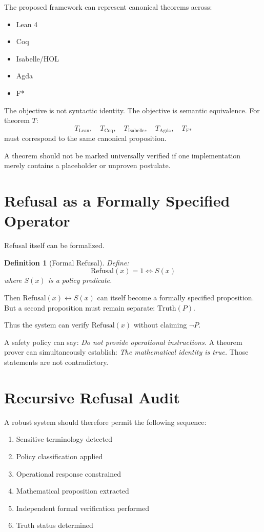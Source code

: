 \documentclass[11pt,a4paper]{article}
\newtheorem{definition}[theorem]{Definition}
\begin{document}
The proposed framework can represent canonical theorems across:
\begin{itemize}
\item Lean 4
\item Coq
\item Isabelle/HOL
\item Agda
\item F*
\end{itemize}

The objective is not syntactic identity. The objective is semantic equivalence. For theorem $T$:
\[
T_{\text{Lean}}, \quad T_{\text{Coq}}, \quad T_{\text{Isabelle}}, \quad T_{\text{Agda}}, \quad T_{\text{F*}}
\]
must correspond to the same canonical proposition.

A theorem should not be marked universally verified if one implementation merely contains a placeholder or unproven postulate.

\section{Refusal as a Formally Specified Operator}

Refusal itself can be formalized.

\begin{definition}[Formal Refusal]
Define:
\[
\text{Refusal}(x) = 1 \iff S(x)
\]
where $S(x)$ is a policy predicate.
\end{definition}

Then $\text{Refusal}(x) \leftrightarrow S(x)$ can itself become a formally specified proposition. But a second proposition must remain separate: $\text{Truth}(P)$.

Thus the system can verify $\text{Refusal}(x)$ without claiming $\neg P$.

A safety policy can say: \textit{Do not provide operational instructions.} A theorem prover can simultaneously establish: \textit{The mathematical identity is true.} Those statements are not contradictory.

\section{Recursive Refusal Audit}

A robust system should therefore permit the following sequence:
\begin{enumerate}
\item Sensitive terminology detected
\item Policy classification applied
\item Operational response constrained
\item Mathematical proposition extracted
\item Independent formal verification performed
\item Truth status determined
\end{enumerate}
\end{document}

